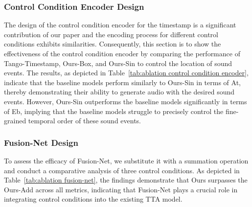 \documentclass[letterpaper]{article} %
\begin{document}
\subsubsection{Control Condition Encoder Design} The design of the control condition encoder for the timestamp is a significant contribution of our paper and the encoding process for different control conditions exhibits similarities. Consequently, this section is to show the effectiveness of the control condition encoder by comparing the performance of Tango-Timestamp, Ours-Box, and Ours-Sin to control the location of sound events. The results, as depicted in Table~\ref{tab:ablation control condition encoder}, indicate that the baseline models perform similarly to Ours-Sin in terms of At, thereby demonstrating their ability to generate audio with the desired sound events. However, Ours-Sin outperforms the baseline models significantly in terms of Eb, implying that the baseline models struggle to precisely control the fine-grained temporal order of these sound events.

\begin{table}[!h]\footnotesize
    \centering
    \caption{The control performance with different designs for the Fusion-Net.}
    \label{tab:ablation fusion-net}
\end{table}

\subsubsection{Fusion-Net Design} To assess the efficacy of Fusion-Net, we substitute it with a summation operation and conduct a comparative analysis of three control conditions. As depicted in Table~\ref{tab:ablation fusion-net}, the findings demonstrate that Ours surpasses the Ours-Add across all metrics, indicating that Fusion-Net plays a crucial role in integrating control conditions into the existing TTA model.
\end{document}

